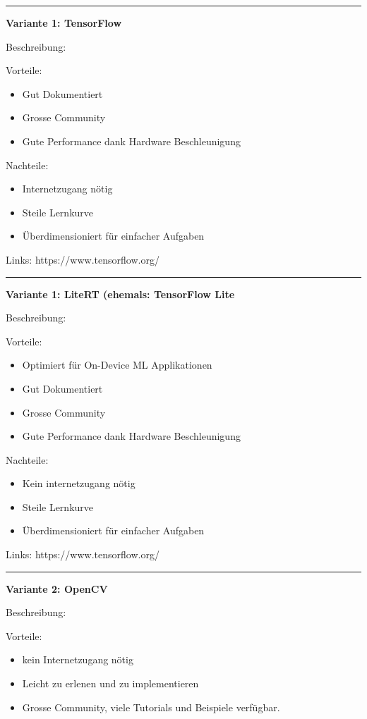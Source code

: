 \vspace{10pt}
\hrule
\textbf{Variante 1: TensorFlow}

Beschreibung:

Vorteile:
\begin{itemize}
    \item Gut Dokumentiert
    \item Grosse Community
    \item Gute Performance dank Hardware Beschleunigung
\end{itemize}


Nachteile:
\begin{itemize}
    \item Internetzugang nötig
    \item Steile Lernkurve
    \item Überdimensioniert für einfacher Aufgaben
\end{itemize}

Links: https://www.tensorflow.org/

\vspace{5pt}
\hrule

\textbf{Variante 1: LiteRT (ehemals: TensorFlow Lite}

Beschreibung:

Vorteile:
\begin{itemize}
    \item Optimiert für On-Device ML Applikationen
    \item Gut Dokumentiert
    \item Grosse Community
    \item Gute Performance dank Hardware Beschleunigung
\end{itemize}


Nachteile:
\begin{itemize}
    \item Kein internetzugang nötig
    \item Steile Lernkurve
    \item Überdimensioniert für einfacher Aufgaben
\end{itemize}

Links: https://www.tensorflow.org/

\vspace{5pt}
\hrule

\textbf{Variante 2: OpenCV}

Beschreibung:

Vorteile:
\begin{itemize}
    \item kein Internetzugang nötig
    \item Leicht zu erlenen und zu implementieren
    \item Grosse Community, viele Tutorials und Beispiele verfügbar.
\end{itemize}

